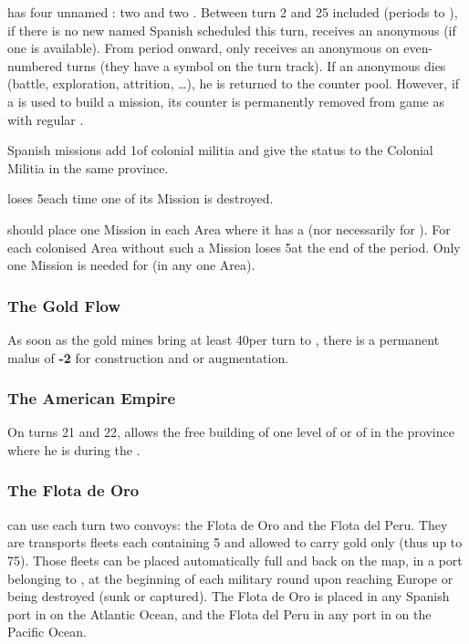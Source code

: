 \bparag \SPA has four unnamed \LeaderMis: two  and
two .
\bparag Between turn 2 and 25 included (periods  to
), if there is no new named Spanish \LeaderMis scheduled
this turn, \SPA receives an anonymous \LeaderMis (if one is
available).
\bparag From period  onward, \SPA only receives an
anonymous \LeaderMis on even-numbered turns (they have a \Xcatholique
symbol on the turn track).
\bparag If an anonymous \LeaderMis dies (battle, exploration,
attrition, \ldots), he is returned to the counter pool.
\bparag However, if a \LeaderMis is used to build a mission, its
counter is permanently removed from game as with regular \LeaderMis.

\aparag Spanish missions add 1\LDE of colonial militia and give the
 status to the Colonial Militia in the same province.

\aparag \SPA loses 5\PV each time one of its Mission is destroyed.

\aparag \SPA should place one Mission in each Area where it has a \COL
(nor necessarily for \TP). For each colonised Area without such a
Mission \SPA loses 5\PV at the end of the period.
\bparag Only one Mission is needed for 
(in any one Area).

\subsubsection{The Gold Flow}
\aparag As soon as the gold mines bring at least 40\ducats per turn to
\SPA, there is a permanent malus of {\bf -2} for \MNU construction and
\FTI or \DTI augmentation.

\subsubsection{The American Empire}
\aparag On turns 21 and 22,  allows the free building
of one level of  or of  in the \ROTW
province where he is during the .


\subsubsection{The Flota de Oro}
\aparag \SPA can use each turn two convoys: the Flota de Oro and the
Flota del Peru. They are transports fleets each containing 5 \NTD and
allowed to carry gold only (thus up to 75\ducats).
\bparag Those fleets can be placed automatically full and back on the
\ROTW map, in a \COL port belonging to \SPA, at the beginning of each
military round upon reaching Europe or being destroyed (sunk or
captured).
\bparag The Flota de Oro is placed in any Spanish port in
 on the Atlantic Ocean, and the Flota del Peru in any
port in  on the Pacific Ocean.

